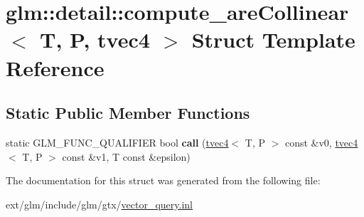 \hypertarget{structglm_1_1detail_1_1compute__are_collinear_3_01_t_00_01_p_00_01tvec4_01_4}{\section{glm\-:\-:detail\-:\-:compute\-\_\-are\-Collinear$<$ T, P, tvec4 $>$ Struct Template Reference}
\label{structglm_1_1detail_1_1compute__are_collinear_3_01_t_00_01_p_00_01tvec4_01_4}
}
\subsection*{Static Public Member Functions}
\begin{DoxyCompactItemize}
\item 
\hypertarget{structglm_1_1detail_1_1compute__are_collinear_3_01_t_00_01_p_00_01tvec4_01_4_a614f1eb934d5e74a6585898a059cf5a0}{static G\-L\-M\-\_\-\-F\-U\-N\-C\-\_\-\-Q\-U\-A\-L\-I\-F\-I\-E\-R bool {\bfseries call} (\hyperlink{structglm_1_1tvec4}{tvec4}$<$ T, P $>$ const \&v0, \hyperlink{structglm_1_1tvec4}{tvec4}$<$ T, P $>$ const \&v1, T const \&epsilon)}\label{structglm_1_1detail_1_1compute__are_collinear_3_01_t_00_01_p_00_01tvec4_01_4_a614f1eb934d5e74a6585898a059cf5a0}

\end{DoxyCompactItemize}


The documentation for this struct was generated from the following file\-:\begin{DoxyCompactItemize}
\item 
ext/glm/include/glm/gtx/\hyperlink{vector__query_8inl}{vector\-\_\-query.\-inl}\end{DoxyCompactItemize}
